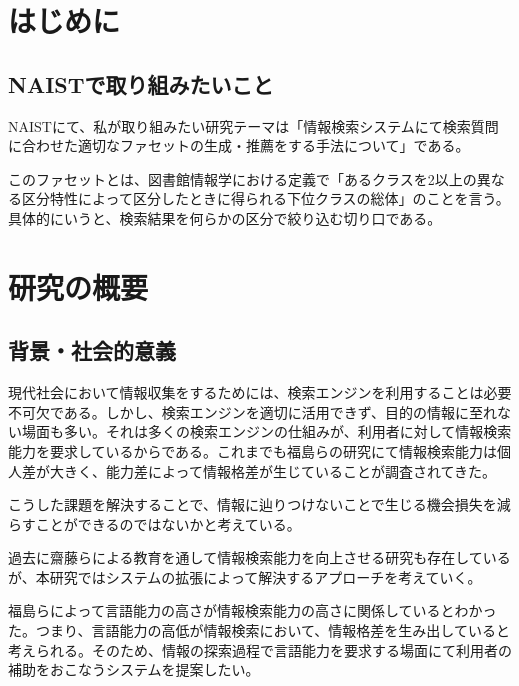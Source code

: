 \documentclass[a4j,10pt, twocolumn]{jarticle} \usepackage[dvipdfmx]{graphicx} \usepackage{amssymb} \usepackage{amsmath}
\begin{document}
\section{はじめに}
\subsection{NAISTで取り組みたいこと}
NAISTにて、私が取り組みたい研究テーマは「情報検索システムにて検索質問に合わせた適切なファセットの生成・推薦をする手法について」である。

このファセットとは、図書館情報学における定義で「あるクラスを2以上の異なる区分特性によって区分したときに得られる下位クラスの総体\cite{libdic}」のことを言う。具体的にいうと、検索結果を何らかの区分で絞り込む切り口である。
\section{研究の概要}
\subsection{背景・社会的意義}
 現代社会において情報収集をするためには、検索エンジンを利用することは必要不可欠である。しかし、検索エンジンを適切に活用できず、目的の情報に至れない場面も多い。それは多くの検索エンジンの仕組みが、利用者に対して情報検索能力を要求しているからである。これまでも福島らの研究にて情報検索能力は個人差が大きく、能力差によって情報格差が生じていることが調査されてきた\cite{fukushima}。

 こうした課題を解決することで、情報に辿りつけないことで生じる機会損失を減らすことができるのではないかと考えている。
 
 過去に齋藤らによる教育を通して情報検索能力を向上させる研究\cite{saito}も存在しているが、本研究ではシステムの拡張によって解決するアプローチを考えていく。

 福島らによって言語能力の高さが情報検索能力の高さに関係しているとわかった\cite{fukushima}。つまり、言語能力の高低が情報検索において、情報格差を生み出していると考えられる。そのため、情報の探索過程で言語能力を要求する場面にて利用者の補助をおこなうシステムを提案したい。
\end{document}
